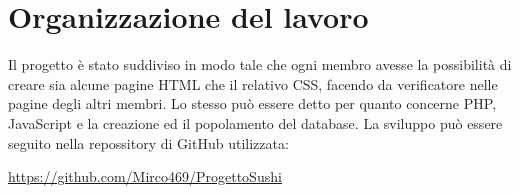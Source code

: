 \documentclass{article}
\begin{document}
	\section{Organizzazione del lavoro}
		Il progetto è stato suddiviso in modo tale che ogni membro avesse la possibilità di creare sia alcune pagine HTML che il relativo CSS, facendo da verificatore nelle pagine degli altri membri.
		Lo stesso può essere detto per quanto concerne PHP, JavaScript e la creazione ed il popolamento del database.
		La sviluppo può essere seguito nella repossitory di GitHub utilizzata:
		\newline
		\newline
		\centerline{ \url{https://github.com/Mirco469/ProgettoSushi}}
\end{document}
